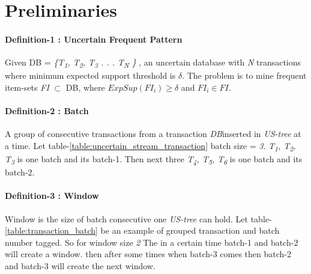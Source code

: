 	
\section{Preliminaries}
	\paragraph{Definition-1 : Uncertain Frequent Pattern} 
	Given DB = \emph{\{T\textsubscript{1}, T\textsubscript{2}, T\textsubscript{3} . . . T\textsubscript{N} \}} , an uncertain database with \emph{N} transactions where minimum expected support threshold is $\delta$. The problem is to mine frequent item-sets \emph{FI} $\subset$ DB, where $ExpSup(FI_i) \geq \delta $ and $FI_i \in FI$.
	
	\paragraph{Definition-2 : Batch} 
	A group of consecutive transactions from a transaction \emph{DB}inserted in \emph{US-tree} at a time. Let table-\ref{table:uncertain_stream_transaction} batch size = \emph{3}. \emph{T\textsubscript{1}, T\textsubscript{2}, T\textsubscript{3}} is one batch and its batch-1. Then next three \emph{T\textsubscript{4}, T\textsubscript{5}, T\textsubscript{6}} is one batch and its batch-2.
	
	\paragraph{Definition-3 : Window} Window is the size of batch consecutive one \emph{US-tree} can hold. Let table-\ref{table:transaction_batch} be an example of grouped transaction and batch number tagged. So for window size \emph{2} The in a certain time batch-1 and batch-2 will create a window. then after some times when batch-3 comes then batch-2 and batch-3 will create the next window.
	
